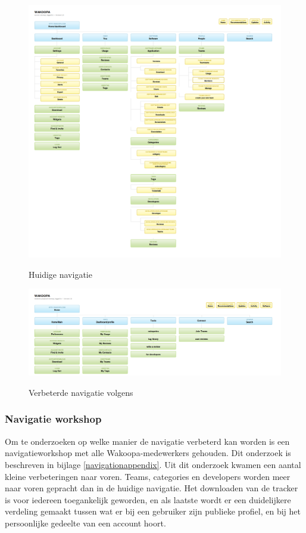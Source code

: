 \documentclass[a4paper, 10pt, pdftex]{report}
\begin{document}
      \begin{figure}
      \begin{center}
      \caption{Huidige navigatie}
        \includegraphics[width=\textwidth]{../images/currentnav}
      \label{currentnav}
      \end{center}
    \end{figure}

    \begin{figure}
      \begin{center}
      \caption{Verbeterde navigatie volgens \cite{Hoekman2008}}
        \includegraphics[width=\textwidth]{../images/miskeetonav}
      \label{miskeetonav}
      \end{center}
    \end{figure}

    \subsubsection{Navigatie workshop}
      Om te onderzoeken op welke manier de navigatie verbeterd kan worden is een navigatieworkshop met alle Wakoopa-medewerkers gehouden. Dit onderzoek is beschreven in bijlage \ref{navigationappendix}. Uit dit onderzoek kwamen een aantal kleine verbeteringen naar voren. Teams, categories en developers worden meer naar voren gepracht dan in de huidige navigatie. Het downloaden van de tracker is voor iedereen toegankelijk geworden, en als laatste wordt er een duidelijkere verdeling gemaakt tussen wat er bij een gebruiker zijn publieke profiel, en bij het persoonlijke gedeelte van een account hoort.
\end{document}
